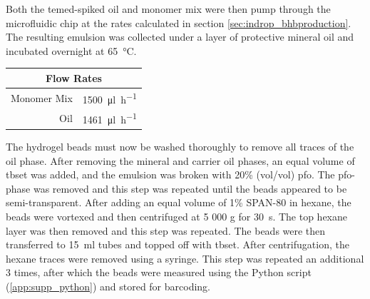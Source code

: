 \begin{appendix}
\begin{multicols}{2}
Both the \acrshort{temed}-spiked oil and monomer mix were then pump through the microfluidic chip at the rates calculated in section \ref{sec:indrop_bhbproduction}. The resulting emulsion was collected under a layer of protective mineral oil and incubated overnight at \SI{65}{\celsius}.\pms

\begin{center}
\begin{tabular}{r|l}
	\multicolumn{2}{c}{Flow Rates} \\
	\hline
	Monomer Mix & \SI{1500}{\ul\per\hour} \\
	Oil & \SI{1461}{\ul\per\hour} \\
\end{tabular}
\end{center}
\medskip

The hydrogel beads must now be washed thoroughly to remove all traces of the oil phase. After removing the mineral and carrier oil phases, an equal volume of \acrshort{tbset} was added, and the emulsion was broken with 20\% (vol/vol) \acrshort{pfo}. The \acrshort{pfo}-phase was removed and this step was repeated until the beads appeared to be semi-transparent. After adding an equal volume of 1\% SPAN-80 in hexane, the beads were vortexed and then centrifuged at 5 000 g for \SI{30}{\s}. The top hexane layer was then removed and this step was repeated. The beads were then transferred to \SI{15}{\ml} tubes and topped off with \acrshort{tbset}. After centrifugation, the hexane traces were removed using a syringe. This step was repeated an additional 3 times, after which the beads were measured using the Python script (\ref{app:supp_python}) and stored for barcoding.\pms


\end{multicols}
\end{appendix}
